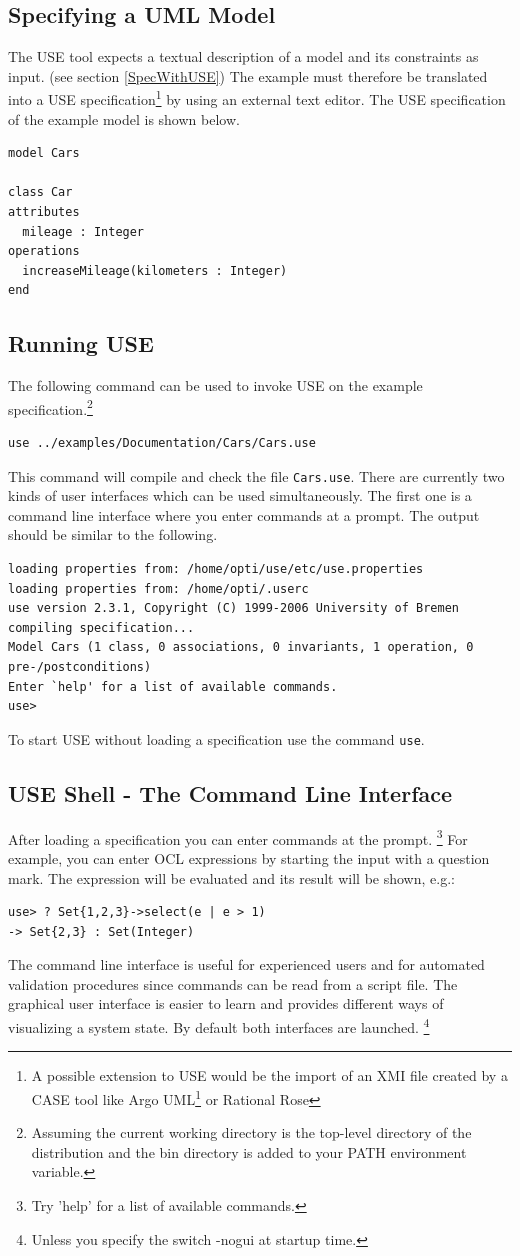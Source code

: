 \documentclass[a4paper,titlepage,oneside,final]{scrreprt} %
\begin{document}
\subsection{Specifying a UML Model}
The USE tool expects a textual description of a model
and its constraints as input. (see section \ref{SpecWithUSE}) The example must therefore be
translated into a USE specification\footnote{A possible extension to
USE would be the import of an XMI file created by a CASE tool like Argo
UML\footnote{http://argouml.tigris.org/} or Rational Rose} by using an external
text editor.
The USE specification of the example model is shown below.
\begin{verbatim}
model Cars

class Car
attributes
  mileage : Integer
operations
  increaseMileage(kilometers : Integer)
end
\end{verbatim}
\subsection{Running USE}
The following command can be used to invoke USE on the example specification.\footnote{Assuming
the current working directory is the top-level directory of the
distribution and the bin directory is added to your PATH environment variable.}
\begin{verbatim}
use ../examples/Documentation/Cars/Cars.use
\end{verbatim}
This command will compile and check the file \verb+Cars.use+.
There are currently two kinds of user interfaces which can be used simultaneously.
The first one is a command line interface where you enter commands at a prompt.
The output should be similar to the following.
\begin{verbatim}
loading properties from: /home/opti/use/etc/use.properties
loading properties from: /home/opti/.userc
use version 2.3.1, Copyright (C) 1999-2006 University of Bremen
compiling specification...
Model Cars (1 class, 0 associations, 0 invariants, 1 operation, 0 pre-/postconditions)
Enter `help' for a list of available commands.
use>
\end{verbatim}
To start USE without loading a specification use the command \verb+use+.
\subsection{USE Shell - The Command Line Interface}
After loading a specification you can enter commands at the prompt.
\footnote{Try 'help' for a list of available commands.} For example,
you can enter OCL expressions by starting the input with a question
mark. The expression will be evaluated and its result will be shown,
e.g.:
\begin{verbatim}
use> ? Set{1,2,3}->select(e | e > 1)
-> Set{2,3} : Set(Integer)
\end{verbatim}
The command line interface is useful for experienced users and for automated validation procedures
since commands can be read from a script file. The graphical user interface is easier
to learn and provides different ways of visualizing a system state.
By default both interfaces are launched. \footnote{Unless you specify the switch -nogui at startup time.}
\end{document}

